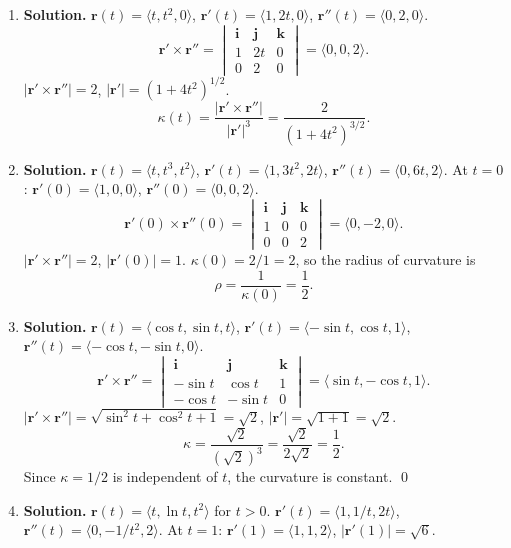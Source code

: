 \begin{enumerate}
\item \textbf{Solution.}
$\mathbf{r}(t)=\langle t, t^2, 0\rangle$, $\mathbf{r}'(t)=\langle 1,2t,0\rangle$, $\mathbf{r}''(t)=\langle 0,2,0\rangle$.
\[
\mathbf{r}'\times\mathbf{r}'' = \begin{vmatrix}\mathbf{i}&\mathbf{j}&\mathbf{k}\\1&2t&0\\0&2&0\end{vmatrix} = \langle 0,0,2\rangle.
\]
$|\mathbf{r}'\times\mathbf{r}''|=2$, $|\mathbf{r}'|=(1+4t^2)^{1/2}$.
\[
\boxed{\kappa(t)=\frac{|\mathbf{r}'\times\mathbf{r}''|}{|\mathbf{r}'|^3}=\frac{2}{(1+4t^2)^{3/2}}.}
\]

\item \textbf{Solution.}
$\mathbf{r}(t)=\langle t, t^3, t^2\rangle$, $\mathbf{r}'(t)=\langle 1, 3t^2, 2t\rangle$, $\mathbf{r}''(t)=\langle 0, 6t, 2\rangle$.
At $t=0$: $\mathbf{r}'(0)=\langle 1,0,0\rangle$, $\mathbf{r}''(0)=\langle 0,0,2\rangle$.
\[
\mathbf{r}'(0)\times\mathbf{r}''(0) = \begin{vmatrix}\mathbf{i}&\mathbf{j}&\mathbf{k}\\1&0&0\\0&0&2\end{vmatrix}=\langle 0,-2,0\rangle.
\]
$|\mathbf{r}'\times\mathbf{r}''|=2$, $|\mathbf{r}'(0)|=1$.
$\kappa(0)=2/1=2$, so the radius of curvature is
\[
\boxed{\rho = \frac{1}{\kappa(0)}=\frac{1}{2}.}
\]

\item \textbf{Solution.}
$\mathbf{r}(t)=\langle \cos t, \sin t, t\rangle$, $\mathbf{r}'(t)=\langle -\sin t, \cos t, 1\rangle$, $\mathbf{r}''(t)=\langle -\cos t, -\sin t, 0\rangle$.
\[
\mathbf{r}'\times\mathbf{r}'' = \begin{vmatrix}\mathbf{i}&\mathbf{j}&\mathbf{k}\\-\sin t&\cos t&1\\-\cos t&-\sin t&0\end{vmatrix} = \langle \sin t, -\cos t, 1\rangle.
\]
$|\mathbf{r}'\times\mathbf{r}''|=\sqrt{\sin^2 t+\cos^2 t+1}=\sqrt{2}$, $|\mathbf{r}'|=\sqrt{1+1}=\sqrt{2}$.
\[
\boxed{\kappa = \frac{\sqrt{2}}{(\sqrt{2})^3}=\frac{\sqrt{2}}{2\sqrt{2}}=\frac{1}{2}.}
\]
Since $\kappa=1/2$ is independent of $t$, the curvature is constant. \qed

\item \textbf{Solution.}
$\mathbf{r}(t)=\langle t, \ln t, t^2\rangle$ for $t>0$.
$\mathbf{r}'(t)=\langle 1, 1/t, 2t\rangle$, $\mathbf{r}''(t)=\langle 0, -1/t^2, 2\rangle$.
At $t=1$: $\mathbf{r}'(1)=\langle 1,1,2\rangle$, $|\mathbf{r}'(1)|=\sqrt{6}$.


\end{enumerate}
